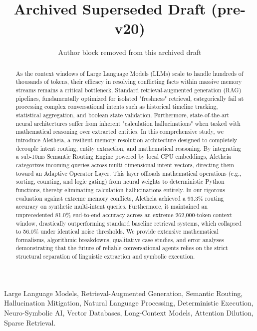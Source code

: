 \documentclass[journal,10pt]{IEEEtran}
\begin{document}
\title{Archived Superseded Draft (pre-v20)}
\author{Author block removed from this archived draft}

\maketitle

\begin{abstract}
As the context windows of Large Language Models (LLMs) scale to handle hundreds of thousands of tokens, their efficacy in resolving conflicting facts within massive memory streams remains a critical bottleneck. Standard retrieval-augmented generation (RAG) pipelines, fundamentally optimized for isolated "freshness" retrieval, categorically fail at processing complex conversational intents such as historical timeline tracking, statistical aggregation, and boolean state validation. Furthermore, state-of-the-art neural architectures suffer from inherent "calculation hallucinations" when tasked with mathematical reasoning over extracted entities. In this comprehensive study, we introduce Aletheia, a resilient memory resolution architecture designed to completely decouple intent routing, entity extraction, and mathematical reasoning. By integrating a sub-10ms Semantic Routing Engine powered by local CPU embeddings, Aletheia categorizes incoming queries across multi-dimensional intent vectors, directing them toward an Adaptive Operator Layer. This layer offloads mathematical operations (e.g., sorting, counting, and logic gating) from neural weights to deterministic Python functions, thereby eliminating calculation hallucinations entirely. In our rigorous evaluation against extreme memory conflicts, Aletheia achieved a 93.3\% routing accuracy on synthetic multi-intent queries. Furthermore, it maintained an unprecedented 81.0\% end-to-end accuracy across an extreme 262,000-token context window, drastically outperforming standard baseline retrieval systems, which collapsed to 56.0\% under identical noise thresholds. We provide extensive mathematical formalisms, algorithmic breakdowns, qualitative case studies, and error analyses demonstrating that the future of reliable conversational agents relies on the strict structural separation of linguistic extraction and symbolic execution.
\end{abstract}

\begin{IEEEkeywords}
Large Language Models, Retrieval-Augmented Generation, Semantic Routing, Hallucination Mitigation, Natural Language Processing, Deterministic Execution, Neuro-Symbolic AI, Vector Databases, Long-Context Models, Attention Dilution, Sparse Retrieval.
\end{IEEEkeywords}
\end{document}
